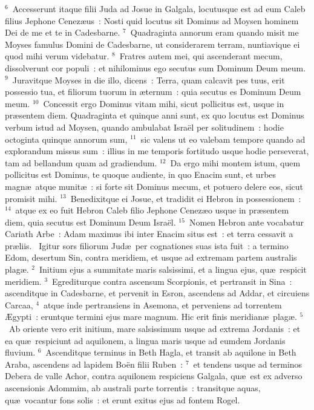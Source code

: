 ${}^{6}$~Accesserunt itaque filii Juda ad Josue in Galgala, locutusque est ad eum Caleb filius Jephone Cenez\ae us~: Nosti quid locutus sit Dominus ad Moysen hominem Dei de me et te in Cadesbarne.
${}^{7}$~Quadraginta annorum eram quando misit me Moyses famulus Domini de Cadesbarne, ut considerarem terram, nuntiavique ei quod mihi verum videbatur.
${}^{8}$~Fratres autem mei, qui ascenderant mecum, dissolverunt cor populi~: et nihilominus ego secutus sum Dominum Deum meum.
${}^{9}$~Juravitque Moyses in die illo, dicens~: Terra, quam calcavit pes tuus, erit possessio tua, et filiorum tuorum in \ae ternum~: quia secutus es Dominum Deum meum.
${}^{10}$~Concessit ergo Dominus vitam mihi, sicut pollicitus est, usque in pr\ae sentem diem. Quadraginta et quinque anni sunt, ex quo locutus est Dominus verbum istud ad Moysen, quando ambulabat Isra\"el per solitudinem~: hodie octoginta quinque annorum sum,
${}^{11}$~sic valens ut eo valebam tempore quando ad explorandum missus sum~: illius in me temporis fortitudo usque hodie perseverat, tam ad bellandum quam ad gradiendum.
${}^{12}$~Da ergo mihi montem istum, quem pollicitus est Dominus, te quoque audiente, in quo Enacim sunt, et urbes magn\ae\ atque munit\ae~: si forte sit Dominus mecum, et potuero delere eos, sicut promisit mihi.
${}^{13}$~Benedixitque ei Josue, et tradidit ei Hebron in possessionem~:
${}^{14}$~atque ex eo fuit Hebron Caleb filio Jephone Cenez\ae o usque in pr\ae sentem diem, quia secutus est Dominum Deum Isra\"el.
${}^{15}$~Nomen Hebron ante vocabatur Cariath Arbe~: Adam maximus ibi inter Enacim situs est~: et terra cessavit a pr\ae liis.
~\lettrine[lines=10,image=true,loversize=0.05,lraise=-0.03]{I}{}gitur sors filiorum Jud\ae\ per cognationes suas ista fuit~: a termino Edom, desertum Sin, contra meridiem, et usque ad extremam partem australis plag\ae .
${}^{2}$~Initium ejus a summitate maris salsissimi, et a lingua ejus, qu\ae\ respicit meridiem.
${}^{3}$~Egrediturque contra ascensum Scorpionis, et pertransit in Sina~: ascenditque in Cadesbarne, et pervenit in Esron, ascendens ad Addar, et circuiens Carcaa,
${}^{4}$~atque inde pertransiens in Asemona, et perveniens ad torrentem \AE gypti~: eruntque termini ejus mare magnum. Hic erit finis meridian\ae\ plag\ae .
${}^{5}$~Ab oriente vero erit initium, mare salsissimum usque ad extrema Jordanis~: et ea qu\ae\ respiciunt ad aquilonem, a lingua maris usque ad eumdem Jordanis fluvium.
${}^{6}$~Ascenditque terminus in Beth Hagla, et transit ab aquilone in Beth Araba, ascendens ad lapidem Bo\"en filii Ruben~:
${}^{7}$~et tendens usque ad terminos Debera de valle Achor, contra aquilonem respiciens Galgala, qu\ae\ est ex adverso ascensionis Adommim, ab australi parte torrentis~: transitque aquas, qu\ae\ vocantur fons solis~: et erunt exitus ejus ad fontem Rogel.
